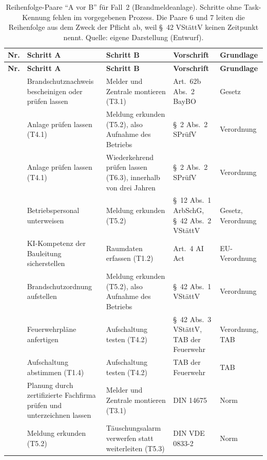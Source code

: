 \begin{small}
\begin{longtable}{@{}>{\raggedright\arraybackslash}p{0.7cm}>{\raggedright\arraybackslash}p{4.2cm}>{\raggedright\arraybackslash}p{4.2cm}>{\raggedright\arraybackslash}p{3.4cm}>{\raggedright\arraybackslash}p{1.9cm}@{}}
\caption[Reihenfolge-Paare für Fall~2]{Reihenfolge-Paare \enquote{A vor B} für Fall~2 (Brandmeldeanlage). Schritte ohne Task-Kennung fehlen im vorgegebenen Prozess. Die Paare 6 und 7 leiten die Reihenfolge aus dem Zweck der Pflicht ab, weil §~42 VStättV keinen Zeitpunkt nennt. Quelle: eigene Darstellung (Entwurf).}\label{tab:h4_paare_fall2}\\
\toprule \textbf{Nr.} & \textbf{Schritt A} & \textbf{Schritt B} & \textbf{Vorschrift} & \textbf{Grundlage} \\ \midrule \endfirsthead
\toprule \textbf{Nr.} & \textbf{Schritt A} & \textbf{Schritt B} & \textbf{Vorschrift} & \textbf{Grundlage} \\ \midrule \endhead
\bottomrule \endfoot
1 & Brandschutznachweis bescheinigen oder prüfen lassen & Melder und Zentrale montieren (T3.1) & Art.~62b Abs.~2 BayBO & Gesetz \\
2 & Anlage prüfen lassen (T4.1) & Meldung erkunden (T5.2), also Aufnahme des Betriebs & §~2 Abs.~2 SPrüfV & Verordnung \\
3 & Anlage prüfen lassen (T4.1) & Wiederkehrend prüfen lassen (T6.3), innerhalb von drei Jahren & §~2 Abs.~2 SPrüfV & Verordnung \\
4 & Betriebspersonal unterweisen & Meldung erkunden (T5.2) & §~12 Abs.~1 ArbSchG, §~42 Abs.~2 VStättV & Gesetz, Verordnung \\
5 & KI-Kompetenz der Bauleitung sicherstellen & Raumdaten erfassen (T1.2) & Art.~4 AI Act & EU-Verordnung \\
6 & Brandschutzordnung aufstellen & Meldung erkunden (T5.2), also Aufnahme des Betriebs & §~42 Abs.~1 VStättV & Verordnung \\
7 & Feuerwehrpläne anfertigen & Aufschaltung testen (T4.2) & §~42 Abs.~3 VStättV, TAB der Feuerwehr & Verordnung, TAB \\
8 & Aufschaltung abstimmen (T1.4) & Aufschaltung testen (T4.2) & TAB der Feuerwehr & TAB \\
9 & Planung durch zertifizierte Fachfirma prüfen und unterzeichnen lassen & Melder und Zentrale montieren (T3.1) & DIN 14675 & Norm \\
10 & Meldung erkunden (T5.2) & Täuschungsalarm verwerfen statt weiterleiten (T5.3) & DIN VDE 0833-2 & Norm \\
\end{longtable}
\end{small}
